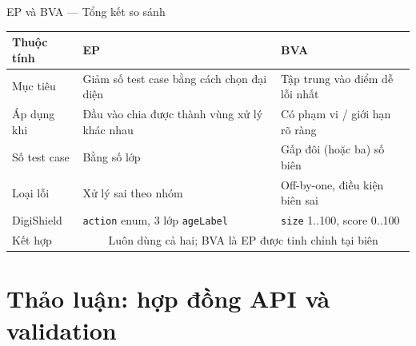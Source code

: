 \documentclass[aspectratio=169,12pt]{beamer}
\begin{document}
\begin{frame}{EP và BVA --- Tổng kết so sánh}
  \begin{center}
  \small
  \begin{tabular}{p{2.5cm}p{4.5cm}p{4cm}}
    \toprule
    \textbf{Thuộc tính} & \textbf{EP} & \textbf{BVA} \\
    \midrule
    Mục tiêu     & Giảm số test case bằng cách chọn đại diện & Tập trung vào điểm dễ lỗi nhất \\
    Áp dụng khi  & Đầu vào chia được thành vùng xử lý khác nhau & Có phạm vi / giới hạn rõ ràng \\
    Số test case & Bằng số lớp & Gấp đôi (hoặc ba) số biên \\
    Loại lỗi     & Xử lý sai theo nhóm & Off-by-one, điều kiện biên sai \\
    DigiShield   & \texttt{action} enum, 3 lớp \texttt{ageLabel} & \texttt{size} 1..100, score 0..100 \\
    Kết hợp      & \multicolumn{2}{c}{Luôn dùng cả hai; BVA là EP được tinh chỉnh tại biên} \\
    \bottomrule
  \end{tabular}
  \end{center}
\end{frame}

\section{Thảo luận: hợp đồng API và validation}
\end{document}
